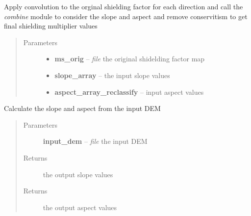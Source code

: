\documentclass[letterpaper,10pt,english]{sphinxmanual}
\begin{document}

\begin{fulllineitems}
\label{docs/shielding:shield_mult.convo_combine}
Apply convolution to the orginal shielding factor for each direction and
call the \emph{combine} module to consider the slope and aspect and remove
conservitism to get final shielding multiplier values
\begin{quote}\begin{description}
\item[{Parameters}] \leavevmode\begin{itemize}
\item {} 
\textbf{ms\_orig} -- \emph{file} the original shidelding factor map

\item {} 
\textbf{slope\_array} --  the input slope values

\item {} 
\textbf{aspect\_array\_reclassify} --  input aspect values

\end{itemize}

\end{description}\end{quote}

\end{fulllineitems}



\begin{fulllineitems}
\label{docs/shielding:shield_mult.get_slope_aspect}
Calculate the slope and aspect from the input DEM
\begin{quote}\begin{description}
\item[{Parameters}] \leavevmode
\textbf{input\_dem} -- \emph{file} the input DEM

\item[{Returns}] \leavevmode
{} the output slope values

\item[{Returns}] \leavevmode
{} the output aspect values

\end{description}\end{quote}

\end{fulllineitems}
\end{document}
